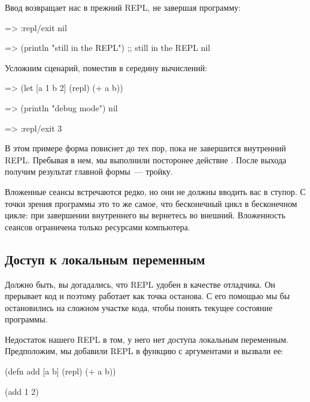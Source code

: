 Ввод  возвращает нас в прежний REPL, не завершая программу:

\begin{english}
  \begin{clojure}
=> :repl/exit
nil

=> (println "still in the REPL")
;; still in the REPL
nil
  \end{clojure}
\end{english}

Усложним сценарий, поместив  в середину вычислений:

\begin{english}
  \begin{clojure/lines}
=> (let [a 1 b 2] (repl) (+ a b))

=> (println "debug mode")
nil

=> :repl/exit
3
  \end{clojure/lines}
\end{english}

В этом примере форма  повиснет до тех пор, пока не завершится внутренний REPL. Пребывая в нем, мы выполнили посторонее действие . После выхода получим результат главной формы~--- тройку.

Вложенные сеансы встречаются редко, но они не должны вводить вас в ступор. С точки зрения программы это то же самое, что бесконечный цикл в бесконечном цикле: при завершении внутреннего вы вернетесь во внешний. Вложенность сеансов ограничена только ресурсами компьютера.

\subsection{Доступ к локальным переменным}

Должно быть, вы догадались, что REPL удобен в качестве отладчика. Он прерывает код и поэтому работает как точка останова. С его помощью мы бы остановились на сложном участке кода, чтобы понять текущее состояние программы.

Недостаток нашего REPL в том, у него нет доступа локальным переменным. Предположим, мы добавили REPL в функцию с аргументами и вызвали ее:

\begin{english}
  \begin{clojure}
(defn add [a b]
  (repl)
  (+ a b))

(add 1 2)
  \end{clojure}
\end{english}

